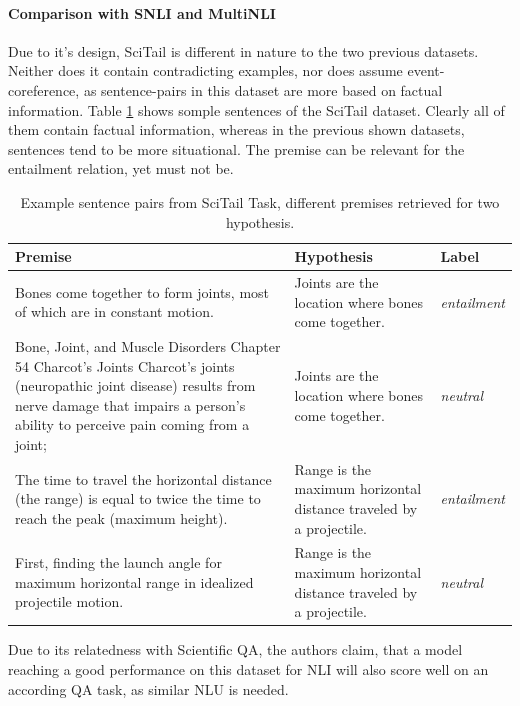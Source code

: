 \paragraph*{Comparison with \ac{SNLI} and \ac{MultiNLI}}
Due to it's design, SciTail is different in nature to the two previous datasets. Neither does it contain contradicting examples, nor does assume event-coreference, as sentence-pairs in this dataset are more based on factual information. Table \ref{table:scitail_example} shows somple sentences of the SciTail dataset. Clearly all of them contain factual information, whereas in the previous shown datasets, sentences tend to be more situational. The premise can be relevant for the entailment relation, yet must not be. 
\begin{table}[!htbp]
\begin{center}
\begin{tabular}{lll}
\textbf{Premise} & \textbf{Hypothesis} & \textbf{Label} \\
\toprule
\multirow{3}{*}{\parbox{9cm}{Bones come together to form joints, most of which are in constant motion.}} & \multirow{3}{*}{\parbox{5cm}{Joints are the location where bones come together.}} & \multirow{3}{*}{\parbox{2cm}{\textit{entailment}}}\\
& &  \\
& &  \\
\multirow{4}{*}{\parbox{9cm}{Bone, Joint, and Muscle Disorders Chapter 54 Charcot's Joints Charcot's joints (neuropathic joint disease) results from nerve damage that impairs a person's ability to perceive pain coming from a joint;}} & \multirow{4}{*}{\parbox{5cm}{Joints are the location where bones come together.}} & \multirow{4}{*}{\parbox{1.5cm}{\textit{neutral}}}\\ 
& &  \\
& &  \\
& &  \\
\midrule
\multirow{3}{*}{\parbox{9cm}{The time to travel the horizontal distance (the range) is equal to twice the time to reach the peak (maximum height).}} & \multirow{3}{*}{\parbox{5cm}{Range is the maximum horizontal distance traveled by a projectile.}} & \multirow{3}{*}{\parbox{1.5cm}{\textit{entailment}}}\\
& &  \\
& &  \\
\multirow{3}{*}{\parbox{9cm}{First, finding the launch angle for maximum horizontal range in idealized projectile motion.}} & \multirow{3}{*}{\parbox{5cm}{Range is the maximum horizontal distance traveled by a projectile.}} & \multirow{3}{*}{\parbox{1.5cm}{\textit{neutral}}}\\ 
& &  \\
& &  \\
\bottomrule
\end{tabular}
\caption{Example sentence pairs from SciTail Task, different premises retrieved for two hypothesis.}
\label{table:scitail_example}
\end{center}
\end{table}
Due to its relatedness with Scientific \ac{QA}, the authors claim, that a model reaching a good performance on this dataset for \ac{NLI} will also score well on an according \ac{QA} task, as similar \ac{NLU} is needed.
